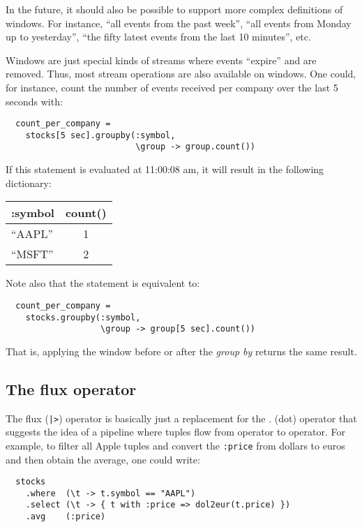 \documentclass{report}
\begin{document}
In the future, it should also be possible to support more complex
definitions of windows. For instance, ``all events from the past
week'', ``all events from Monday up to yesterday'', ``the fifty latest
events from the last 10 minutes'', etc.

Windows are just special kinds of streams where events ``expire'' and
are removed. Thus, most stream operations are also available on
windows. One could, for instance, count the number of events received
per company over the last 5 seconds with:

\begin{verbatim}
  count_per_company =
    stocks[5 sec].groupby(:symbol,
                          \group -> group.count())
\end{verbatim}

If this statement is evaluated at 11:00:08 am, it will result in the
following dictionary:

\begin{tabular}{ |l|c| }
  \hline
  :symbol & count() \\
  \hline
  ``AAPL'' & 1 \\
  ``MSFT'' & 2 \\
  \hline
\end{tabular}

Note also that the statement is equivalent to:

\begin{verbatim}
  count_per_company =
    stocks.groupby(:symbol,
                   \group -> group[5 sec].count())
\end{verbatim}

That is, applying the window before or after the \emph{group by}
returns the same result.

\subsection{The flux operator}
\label{sec:flux}

The flux (\verb=|>=) operator is basically just a replacement for the
. (dot) operator that suggests the idea of a pipeline where tuples
flow from operator to operator. For example, to filter all Apple
tuples and convert the \verb=:price= from dollars to euros and then
obtain the average, one could write:

\begin{verbatim}
  stocks
    .where  (\t -> t.symbol == "AAPL")
    .select (\t -> { t with :price => dol2eur(t.price) })
    .avg    (:price)
\end{verbatim}
\end{document}
